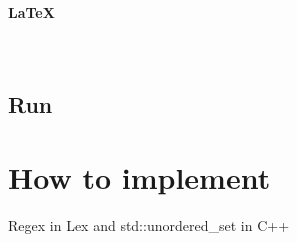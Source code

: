 \documentclass[12pt,a4paper]{article}
\begin{document}
\begin{CJK}{UTF8}{bsmi}
    \paragraph{\LaTeX}\mbox{}\\

    \subsection{Run}


    \section{How to implement}
    Regex in Lex and std::unordered\_set in C++


\end{CJK}
\end{document}
